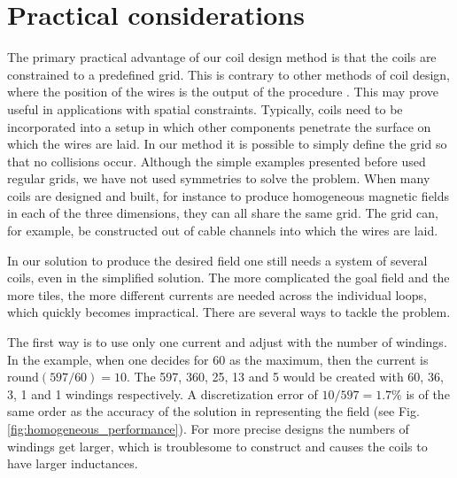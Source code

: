 \section{Practical considerations}
The primary practical advantage of our coil design method is that the coils are constrained to a predefined grid. This is contrary to other methods of coil design, where the position of the wires is the output of the procedure \cite{Turner1993, Beidler1990}. This may prove useful in applications with spatial constraints. Typically, coils need to be incorporated into a setup in which other components penetrate the surface on which the wires are laid. In our method it is possible to simply define the grid so that no collisions occur. Although the simple examples presented before used regular grids, we have not used symmetries to solve the problem. When many coils are designed and built, for instance to produce homogeneous magnetic fields in each of the three dimensions, they can all share the same grid. The grid can, for example, be constructed out of cable channels into which the wires are laid.

In our solution to produce the desired field one still needs a system of several coils, even in the simplified solution. The more complicated the goal field and the more tiles, the more different currents are needed across the individual loops, which quickly becomes impractical. There are several ways to tackle the problem.

The first way is to use only one current and adjust with the number of windings. In the example, when one decides for 60 as the maximum, then the current is $\mathrm{round}(597 / 60) = 10$. The 597, 360, 25, 13 and 5 would be created with 60, 36, 3, 1 and 1 windings respectively. A discretization error of $10 / 597 = 1.7\%$ is of the same order as the accuracy of the solution in representing the field (see Fig.\,\ref{fig:homogeneous_performance}). For more precise designs the numbers of windings get larger, which is troublesome to construct and causes the coils to have larger inductances.



